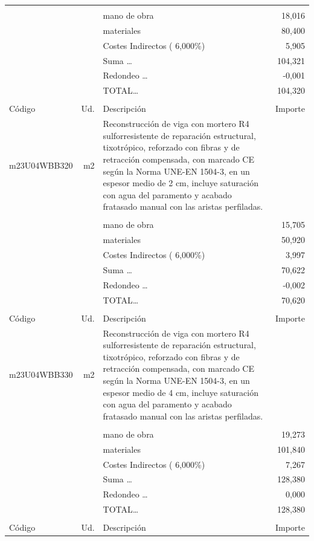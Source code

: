 \begin{supertabular}{l r p{60mm} r}
&&&\\%
&&mano de obra&    18,016\\%
&&materiales&    80,400\\%
&&Costes Indirectos (     6,000\%)&     5,905\\%
&&Suma \ldots&   104,321\\%
&&Redondeo \ldots&    {-}0,001\\%
%
&&TOTAL\ldots&   104,320\\%
&&&\\%
Código&Ud.&Descripción&Importe\\%
\hline%
m23U04WBB320&m2&Reconstrucción de viga con mortero R4 sulforresistente de reparación estructural, tixotrópico, reforzado con fibras y de retracción compensada, con marcado CE según la Norma UNE{-}EN 1504{-}3, en un espesor medio de 2 cm, incluye saturación con agua del paramento y acabado fratasado manual con las aristas perfiladas.&\\%
&&&\\%
&&mano de obra&    15,705\\%
&&materiales&    50,920\\%
&&Costes Indirectos (     6,000\%)&     3,997\\%
&&Suma \ldots&    70,622\\%
&&Redondeo \ldots&    {-}0,002\\%
%
&&TOTAL\ldots&    70,620\\%
&&&\\%
Código&Ud.&Descripción&Importe\\%
\hline%
m23U04WBB330&m2&Reconstrucción de viga con mortero R4 sulforresistente de reparación estructural, tixotrópico, reforzado con fibras y de retracción compensada, con marcado CE según la Norma UNE{-}EN 1504{-}3, en un espesor medio de 4 cm, incluye saturación con agua del paramento y acabado fratasado manual con las aristas perfiladas.&\\%
&&&\\%
&&mano de obra&    19,273\\%
&&materiales&   101,840\\%
&&Costes Indirectos (     6,000\%)&     7,267\\%
&&Suma \ldots&   128,380\\%
&&Redondeo \ldots&     0,000\\%
%
&&TOTAL\ldots&   128,380\\%
&&&\\%
Código&Ud.&Descripción&Importe\\%

\end{supertabular}
